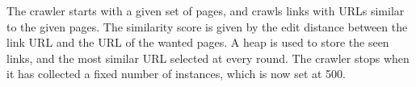 	The crawler starts with a given set of pages, and crawls links with URLs similar to the given pages. The similarity score is given by the edit distance between the link URL and the URL of the wanted pages. A heap is used to store the seen links, and the most similar URL selected at every round. The crawler stops when it has collected a fixed number of instances, which is now set at 500.


